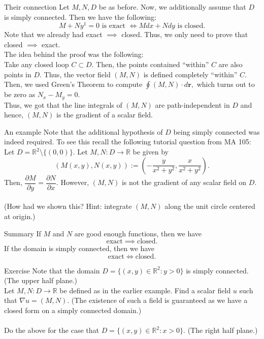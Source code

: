 \documentclass[handout, aspectratio=169]{beamer}
\begin{document}
\begin{frame}{Their connection} 
	Let $M, N, D$ be as before. Now, we additionally assume that $D$ is simply connected. Then we have the following:
	\[M + Ny^1 = 0 \text{ is exact } \iff Mdx + Ndy \text{ is closed}.\]
	Note that we already had exact $\implies$ closed. Thus, we only need to prove that closed $\implies$ exact.\\
	The idea behind the proof was the following:\\
	Take any closed loop $C \subset D$. Then, the points contained ``within'' $C$ are also points in $D.$ Thus, the vector field $(M, N)$ is defined completely ``within'' $C.$ Then, we used Green's Theorem to compute $\displaystyle\oint(M, N)\cdot d\mathbf{r},$ which turns out to be zero as $N_x - M_y = 0.$\\
	Thus, we got that the line integrals of $(M, N)$ are path-independent in $D$ and hence, $(M, N)$ is the gradient of a scalar field.
\end{frame}
\begin{frame}{An example} 
	Note that the additional hypothesis of $D$ being simply connected was indeed required. To see this recall the following tutorial question from MA 105:\\
	Let $D = \mathbb{R}^2\setminus\{(0, 0)\}.$ Let $M, N:D\to\mathbb{R}$ be given by
	\[(M(x, y), N(x, y)) := \left(-\frac{y}{x^2 + y^2}, \frac{x}{x^2 + y^2}\right).\]
	Then, $\dfrac{\partial M}{\partial y} = \dfrac{\partial N}{\partial x}.$ However, $(M, N)$ is not the gradient of any scalar field on $D.$\\~\\
	(How had we shown this? Hint: integrate $(M, N)$ along the unit circle centered at origin.)
\end{frame}
\begin{frame}{Summary} 
	If $M$ and $N$ are good enough functions, then we have 
	\[\text{exact} \implies \text{closed}.\]
	If the domain is simply connected, then we have
	\[\text{exact} \iff \text{closed}.\]
\end{frame}
\begin{frame}{Exercise} 
	Note that the domain $D = \{(x, y) \in \mathbb{R}^2 : y > 0\}$ is simply connected. (The upper half plane.)\\
	Let $M, N:D \to \mathbb{R}$ be defined as in the earlier example. Find a scalar field $u$ such that $\nabla u = (M, N).$ (The existence of such a field is guaranteed as we have a closed form on a simply connected domain.)\\~\\
	Do the above for the case that $D = \{(x, y) \in \mathbb{R}^2 : x > 0\}.$ (The right half plane.)\\
\end{frame}
\end{document}

